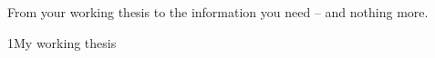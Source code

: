 
\newcommand{\website}{https://edu-mrh.de/englisch/12/w-seminar-time/research-methods.html}
\newcommand{\job}[2]{{\headfont\small\textcolor{#1}{#2}}}
\newcommand{\hk}{\raisebox{-0.3ex}{\textcolor{muted}{\Large$\square$}}}   %



%
{From your working thesis to the information you need – and nothing more.}

\begin{wsbox}{1}{My working thesis}
\begin{lueckentext}
\end{lueckentext}
\end{wsbox}

